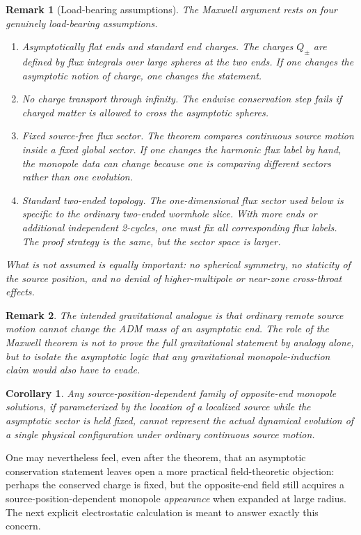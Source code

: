 \documentclass[aps,prd,onecolumn,nofootinbib,superscriptaddress]{revtex4-2}
\newtheorem{corollary}{Corollary}
\newtheorem{remark}{Remark}
\begin{document}
\begin{remark}[Load-bearing assumptions]
The Maxwell argument rests on four genuinely load-bearing assumptions.
\begin{enumerate}
    \item \emph{Asymptotically flat ends and standard end charges.} The charges $Q_\pm$ are defined by flux integrals over large spheres at the two ends. If one changes the asymptotic notion of charge, one changes the statement.
    \item \emph{No charge transport through infinity.} The endwise conservation step fails if charged matter is allowed to cross the asymptotic spheres.
    \item \emph{Fixed source-free flux sector.} The theorem compares continuous source motion inside a fixed global sector. If one changes the harmonic flux label by hand, the monopole data can change because one is comparing different sectors rather than one evolution.
    \item \emph{Standard two-ended topology.} The one-dimensional flux sector used below is specific to the ordinary two-ended wormhole slice. With more ends or additional independent 2-cycles, one must fix all corresponding flux labels. The proof strategy is the same, but the sector space is larger.
\end{enumerate}
What is \emph{not} assumed is equally important: no spherical symmetry, no staticity of the source position, and no denial of higher-multipole or near-zone cross-throat effects.
\end{remark}

\begin{remark}
The intended gravitational analogue is that ordinary remote source motion cannot change the ADM mass of an asymptotic end. The role of the Maxwell theorem is not to prove the full gravitational statement by analogy alone, but to isolate the asymptotic logic that any gravitational monopole-induction claim would also have to evade.
\end{remark}

\begin{corollary}
Any source-position-dependent family of opposite-end monopole solutions, if parameterized by the location of a localized source while the asymptotic sector is held fixed, cannot represent the actual dynamical evolution of a single physical configuration under ordinary continuous source motion.
\end{corollary}

One may nevertheless feel, even after the theorem, that an asymptotic conservation statement leaves open a more practical field-theoretic objection: perhaps the conserved charge is fixed, but the opposite-end field still acquires a source-position-dependent monopole \emph{appearance} when expanded at large radius. The next explicit electrostatic calculation is meant to answer exactly this concern.
\end{document}
